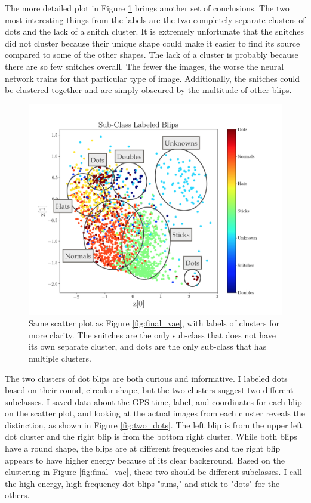\documentclass[a4paper]{article}
\begin{document}
The more detailed plot in Figure \ref{fig:detailed_vae} brings another set of conclusions. The two most interesting things from the labels are the two completely separate clusters of dots and the lack of a snitch cluster. It is extremely unfortunate that the snitches did not cluster because their unique shape could make it easier to find its source compared to some of the other shapes. The lack of a cluster is probably because there are so few snitches overall. The fewer the images, the worse the neural network trains for that particular type of image. Additionally, the snitches could be clustered together and are simply obscured by the multitude of other blips. 

\begin{figure}[h!]
	\centering
	\includegraphics[width=.8\linewidth]{vae_detailed}
	\caption{Same scatter plot as Figure \ref{fig:final_vae}, with labels of clusters for more clarity. The snitches are the only sub-class that does not have its own separate cluster, and dots are the only sub-class that has multiple clusters.}
	\label{fig:detailed_vae}
\end{figure}

The two clusters of dot blips are both curious and informative. I labeled dots based on their round, circular shape, but the two clusters suggest two different subclasses. I saved data about the GPS time, label, and coordinates for each blip on the scatter plot, and looking at the actual images from each cluster reveals the distinction, as shown in Figure \ref{fig:two_dots}. The left blip is from the upper left dot cluster and the right blip is from the bottom right cluster. While both blips have a round shape, the blips are at different frequencies and the right blip appears to have higher energy because of its clear background. Based on the clustering in Figure \ref{fig:final_vae}, these two should be different subclasses. I call the high-energy, high-frequency dot blips "suns," and stick to "dots" for the others.
\end{document}
